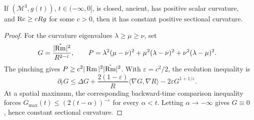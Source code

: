 \begin{theorem}
\label{thm:chow-iv-3d-pinched-ricci}
If \((\mathcal M^3,g(t))\), \(t\in(-\infty,0]\), is closed, ancient, has
positive scalar curvature, and \(\operatorname{Rc}\ge cRg\) for some \(c>0\), then it has
constant positive sectional curvature.
\end{theorem}
\begin{proof}
For the curvature eigenvalues \(\lambda\ge\mu\ge\nu\), set
\[
 G=\frac{|\mathring{\operatorname{Rm}}|^2}{R^{2-\varepsilon}},\qquad
 P=\lambda^2(\mu-\nu)^2+\mu^2(\lambda-\nu)^2+\nu^2(\lambda-\mu)^2.
\]
The pinching gives \(P\ge c^2|\operatorname{Rm}|^2|\mathring{\operatorname{Rm}}|^2\).  With
\(\varepsilon=c^2/2\), the evolution inequality is
\[
 \partial_tG\le\Delta G+\frac{2(1-\varepsilon)}R\langle\nabla G,\nabla R\rangle
 -2\varepsilon G^{1+1/\varepsilon}.
\]
At a spatial maximum, the corresponding backward-time comparison inequality
forces \(G_{\max}(t)\le(2(t-\alpha))^{-\varepsilon}\) for every
\(\alpha< t\).  Letting \(\alpha\to-\infty\) gives \(G\equiv0\), hence
constant sectional curvature.
\end{proof}
